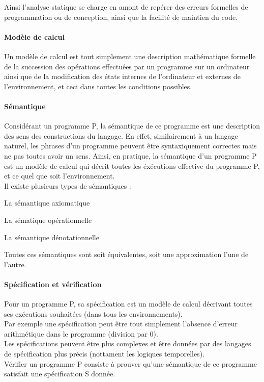 \documentclass[french]{report}
\begin{document}
Ainsi l'analyse statique se charge en amont de repérer des erreurs formelles de programmation
ou de conception, ainsi que la facilité de maintien du code.


\paragraph{Modèle de calcul}
Un modèle de calcul est tout simplement une description mathématique formelle
de la succession des opérations effectuées par un programme sur un ordinateur ainsi que de
la modification des états internes de l'ordinateur et externes de l'environnement, et ceci
dans toutes les conditions possibles.

\paragraph{Sémantique}
Considérant un programme P, la sémantique de ce programme est une description des sens des
constructions du langage. En effet, similairement à un langage naturel, les phrases d'un programme
peuvent être syntaxiquement correctes mais ne pas toutes avoir un sens. Ainsi, en pratique,
la sémantique d'un programme P est un modèle de calcul qui décrit toutes les
éxécutions effective du programme P, et ce quel que soit l'environnement. \\
Il existe plusieurs types de sémantiques :
\begin{description}
    \item La sémantique axiomatique
    \item La sématique opérationnelle
    \item La sémantique dénotationnelle
\end{description}
Toutes ces sémantiques sont soit équivalentes, soit une approximation l'une de l'autre.

\paragraph{Spécification et vérification}
Pour un programme P, sa spécification est un modèle de calcul décrivant toutes ses
exécutions souhaitées (dans tous les environnements).  \\
Par exemple une spécification peut être tout simplement l'absence d'erreur arithmétique
dans le programme (division par 0). \\
Les spécifications peuvent être plus complexes et être données par des langages
de spécification plus précis (nottament les logiques temporelles). \\
Vérifier un programme P consiste à prouver qu’une sémantique de ce programme
satisfait une spécification S donnée. \\
\end{document}
